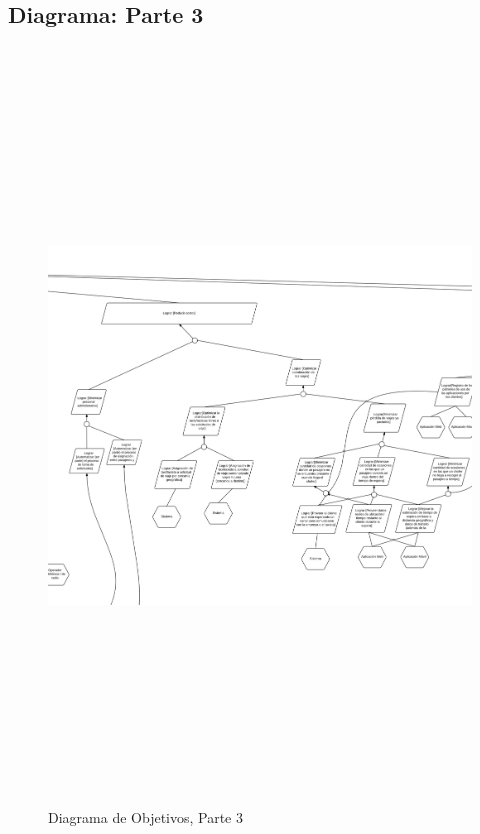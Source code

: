 \documentclass[a4paper, 10pt, twoside]{article}
\begin{document}
\subsection{Diagrama: Parte 3}
\begin{figure}[H]
  \includegraphics[angle=90,height=20cm]{diagramas/diagrama-objetivos-2.png}
  \caption{Diagrama de Objetivos, Parte 3}
  \label{fig:diagrama-objetivos-2}
\end{figure}
\newpage
\end{document}
